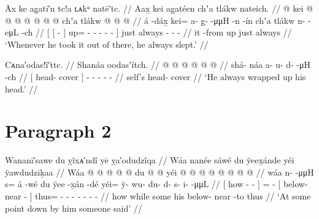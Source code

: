 \ex\label{ex:90-14-take-out-sleep}%
%
\begingl
	\glpreamble	Āx ke ag̣atī′n tc!a ʟᴀkᵘ natē′tc. //
	\glpreamble	Aax̱ kei ag̱atéen chʼa tlákw nateich. //
	\gla	{} {}  @ {} {}
			kei @  @ {} @ {} @ {} @ {} @ {} @ {} {}
		chʼa tlákw  @ {} @ {} @ {} //
	\glb	{} {} á -dáx̱ {}
			kei= a- {} g̱-  -μμH -n -ín {}
		chʼa tlákw n-  -eμL -ch //
	\glc	{}[ {}[  - {}]
			up= - \· -  - - - {}]
		just always -  - - //
	\gld	{} {} it -from {}
			up  {} {} {} {} {} {} {}
		just always  {} {} {} //
	\glft	‘Whenever he took it out of there, he always slept.’
		//
\endgl
\xe

\ex\label{ex:90-15-wrap-head}%
%
\begingl
	\glpreamble	Cᴀna′odas!î′ttc. //
	\glpreamble	Shanáa oodasʼítch. //
	\gla	{} {}  @ {} {}
		 @ {} @ {} @ {} @ {} @ {} //
	\glb	{} {} shá- náa {}
		a- u- d-  -μH -ch //
	\glc	{}[  head- cover {}]
		- - -  - - //
	\gld	{} self’s head- cover {}
		 {} {} {} {} {} //
	\glft	‘He always wrapped up his head.’
		//
\endgl
\xe

\clearpage
\section{Paragraph 2}\label{sec:90-para-2}

\ex\label{ex:90-16-something-says-below}%
%
\begingl
	\glpreamble	Wananī′sawe du ỵîxᴀ′ndî yē ỵa′odudzîqa //
	\glpreamble	Wáa nanée sáwé du ÿeex̱ánde yéi ÿawdudziḵaa //
	\gla	{} Wáa  @ {} @ {} @ {} {}
		 @ {} @ {}
		{} du  @ {} @ {} {}
		yéi @  @ {} @ {} @ {} @ {} @ {} @ {} @ {} //
	\glb	{} wáa n-  -μμH {} {} 
		s= á -wé
		{} du ÿee -x̱án -dé {}
		yéi= ÿ- wu- du- d- s- i-  -μμL //
	\glc	{}[ how -  - \· {}]
		=  -
		{}[  below- near - {}]
		thus= - - - - - -  - //
	\gld	{} how  {} {} \·while {}
		some\·  {}
		{} his below- near -to {}
		thus  {} {} {} {} {} {} {} //
	\glft	‘At some point down by him someone said’
		//
\endgl
\xe


